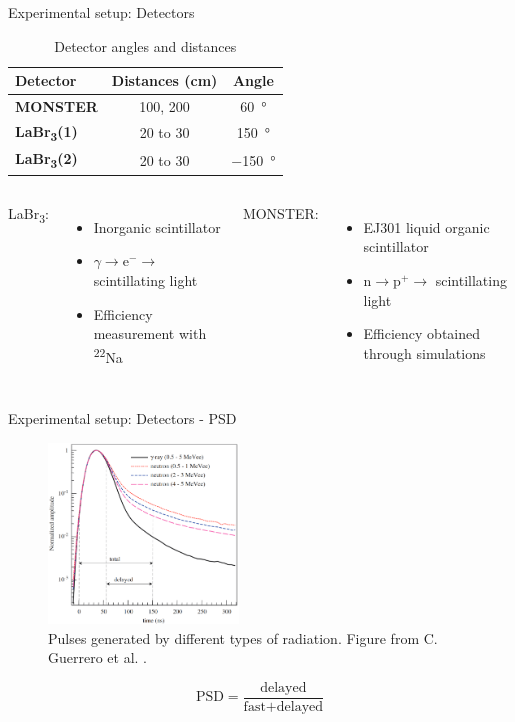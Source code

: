 \documentclass[11pt]{beamer}
\newcommand{\Na}{\textsuperscript{22}Na }
\begin{document}
\begin{frame}{Experimental setup: Detectors}
	\begin{table}[H]
		\centering
		\begin{tabular}[c]{>{\bfseries}l||c|c}
			Detector                & Distances (\unit{\cm})& Angle\\ \hline
			\textbf{MONSTER}        &\num{100}, \num{200}           &\qty{60}{\degree}      \\ \hline
			\textbf{LaBr\textsubscript{3}(1)}               &\num{20} to \num{30}           &\qty{150}{\degree}     \\ \hline
			\textbf{LaBr\textsubscript{3}(2)}               &\num{20} to \num{30}           &\qty{-150}{\degree}    \\ \hline
		\end{tabular}
		\caption{Detector angles and distances}
		\label{distances_angles_table}
	\end{table}
	\begin{columns}
	LaBr\textsubscript{3}:
	\begin{itemize}
		\item Inorganic scintillator
		\item $\gamma\longrightarrow\text{e}^-\longrightarrow$ scintillating light
		\item Efficiency measurement with \Na
	\end{itemize}
	MONSTER:
	\begin{itemize}
		\item EJ301 liquid organic scintillator
		\item $\text{n}\longrightarrow\text{p}^+\longrightarrow$ scintillating light
		\item Efficiency obtained through simulations
	\end{itemize}
	\end{columns}
\end{frame}

\begin{frame}{Experimental setup: Detectors - PSD}
	\begin{figure}[H]
		\centering
		\includegraphics[width=0.45\textwidth]{psd_explanation.png}
		\caption{Pulses generated by different types of radiation. Figure from C. Guerrero et al. \cite{guerrero2008}.}
		\label{}
	\end{figure}
	\begin{equation}
		\text{PSD} = \frac{\text{delayed}}{\text{fast}+\text{delayed}}
	\end{equation}
\end{frame}
\end{document}
